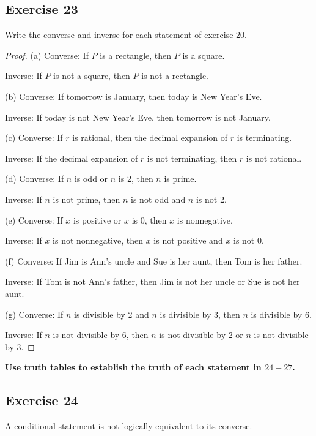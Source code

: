 \documentclass[14pt]{extarticle}
\begin{document}
\subsection{Exercise 23}
Write the converse and inverse for each statement of exercise 20.

\begin{proof}
    (a) Converse: If $P$ is a rectangle, then $P$ is a square.

    Inverse: If $P$ is not a square, then $P$ is not a rectangle.

    (b) Converse: If tomorrow is January, then today is New Year’s Eve.

    Inverse: If today is not New Year’s Eve, then tomorrow is not January.

    (c) Converse: If $r$ is rational, then the decimal expansion of $r$ is terminating.

    Inverse: If the decimal expansion of $r$ is not terminating, then $r$ is not rational.

    (d) Converse: If $n$ is odd or $n$ is 2, then $n$ is prime.

    Inverse: If $n$ is not prime, then $n$ is not odd and $n$ is not 2.

    (e) Converse: If $x$ is positive or $x$ is 0, then $x$ is nonnegative.

    Inverse: If $x$ is not nonnegative, then $x$ is not positive and $x$ is not 0.

    (f) Converse: If Jim is Ann’s uncle and Sue is her aunt, then Tom is her father.

    Inverse: If Tom is not Ann’s father, then Jim is not her uncle or Sue is not her aunt.

    (g) Converse: If $n$ is divisible by 2 and $n$ is divisible by 3, then $n$ is divisible by 6.

    Inverse: If $n$ is not divisible by 6, then $n$ is not divisible by 2 or $n$ is not divisible by 3.
\end{proof}

{\bf Use truth tables to establish the truth of each statement in $24-27$.}

\subsection{Exercise 24}
A conditional statement is not logically equivalent to its converse.
\end{document}
